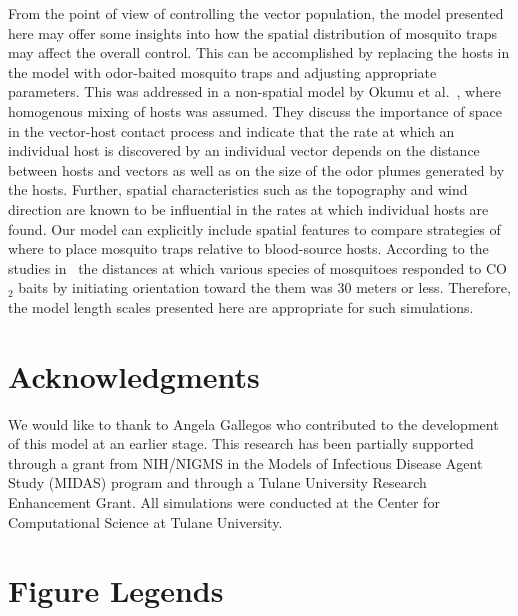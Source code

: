 \documentclass[10pt]{article}
\begin{document}
From the point of view of controlling the vector population, the model presented here may offer some insights into how the spatial distribution of mosquito traps may affect the overall control.  This can be accomplished by replacing the hosts in the model with odor-baited mosquito traps and adjusting appropriate parameters.  This was addressed in a non-spatial model by Okumu et al.~\cite{OkumuModel2010}, where homogenous mixing of hosts was assumed.  They discuss the importance of space in the vector-host contact process and indicate that the rate at which an individual host is discovered by an individual vector depends on the distance between hosts and vectors as well as on the size of the odor plumes generated by the hosts.  Further, spatial characteristics such as the topography and wind direction are known to be influential in the rates at which individual hosts are found.  Our model can explicitly include spatial features to compare strategies of where to place mosquito traps relative to blood-source hosts.
According to the studies in~\cite{Gillies1972} the distances at which various species of mosquitoes responded to CO$_2$ baits by initiating orientation toward the them was 30 meters or less. Therefore, the model length scales presented here are appropriate for such simulations.


\section*{Acknowledgments}
We would like to thank to Angela Gallegos  who contributed to the development of this model at an earlier stage. This research has been partially supported through a grant from NIH/NIGMS in the Models of Infectious Disease Agent Study (MIDAS) program and through a Tulane University Research Enhancement Grant.  All simulations were conducted at the Center for Computational Science at Tulane University.



\newpage
\section*{Figure Legends}
\end{document}
